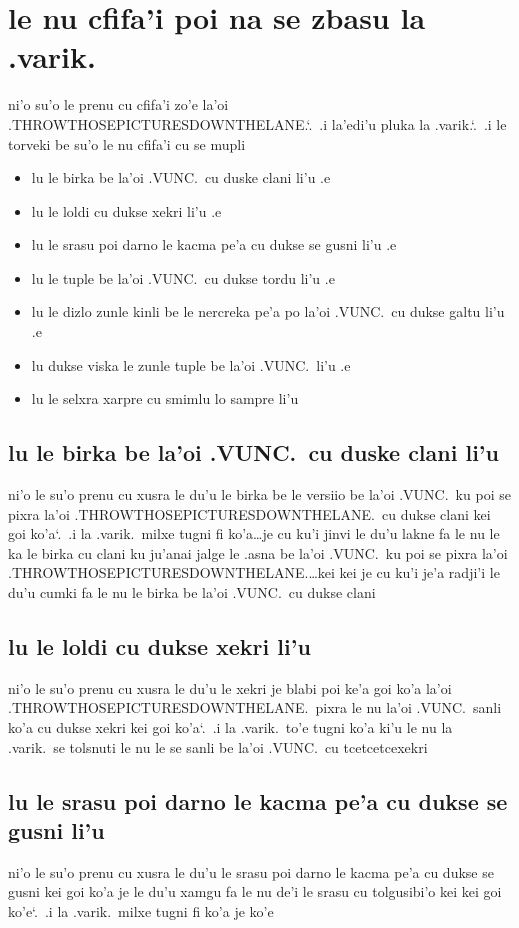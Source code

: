 \documentclass{report}
\newcommand\sds{\spacefactor\sfcode`.\ \space}
\begin{document}
\section{le nu cfifa'i poi na se zbasu la .varik.}
ni'o su'o le prenu cu cfifa'i zo'e la'oi .THROWTHOSEPICTURESDOWNTHELANE.\sds  .i la'edi'u pluka la .varik.\sds  .i le torveki be su'o le nu cfifa'i cu se mupli
\begin{itemize}
	\item lu le birka be la'oi .VUNC.\ cu duske clani li'u .e
	\item lu le loldi cu dukse xekri li'u .e
	\item lu le srasu poi darno le kacma pe'a cu dukse se gusni li'u .e
	\item lu le tuple be la'oi .VUNC.\ cu dukse tordu li'u .e
	\item lu le dizlo zunle kinli be le nercreka pe'a po la'oi .VUNC.\ cu dukse galtu li'u .e
	\item lu dukse viska le zunle tuple be la'oi .VUNC.\ li'u .e
	\item lu le selxra xarpre cu smimlu lo sampre li'u
\end{itemize}

\subsection{lu le birka be la'oi .VUNC.\ cu duske clani li'u}
ni'o le su'o prenu cu xusra le du'u le birka be le versiio be la'oi .VUNC.\ ku poi se pixra la'oi .THROWTHOSEPICTURESDOWNTHELANE.\ cu dukse clani kei goi ko'a\sds  .i la .varik.\ milxe tugni fi ko'a\ldots je cu ku'i jinvi le du'u lakne fa le nu le ka le birka cu clani ku ju'anai jalge le .asna be la'oi .VUNC.\ ku poi se pixra la'oi .THROWTHOSEPICTURESDOWNTHELANE.\ldots kei kei je cu ku'i je'a radji'i le du'u cumki fa le nu le birka be la'oi .VUNC.\ cu dukse clani

\subsection{lu le loldi cu dukse xekri li'u}
ni'o le su'o prenu cu xusra le du'u le xekri je blabi poi ke'a goi ko'a la'oi .THROWTHOSEPICTURESDOWNTHELANE.\ pixra le nu la'oi .VUNC.\ sanli ko'a cu dukse xekri kei goi ko'a\sds  .i la .varik.\ to'e tugni ko'a ki'u le nu la .varik.\ se tolsnuti le nu le se sanli be la'oi .VUNC.\ cu tcetcetcexekri

\subsection{lu le srasu poi darno le kacma pe'a cu dukse se gusni li'u}
ni'o le su'o prenu cu xusra le du'u le srasu poi darno le kacma pe'a cu dukse se gusni kei goi ko'a je le du'u xamgu fa le nu de'i le srasu cu tolgusibi'o kei kei goi ko'e\sds  .i la .varik.\ milxe tugni fi ko'a je ko'e
\end{document}
